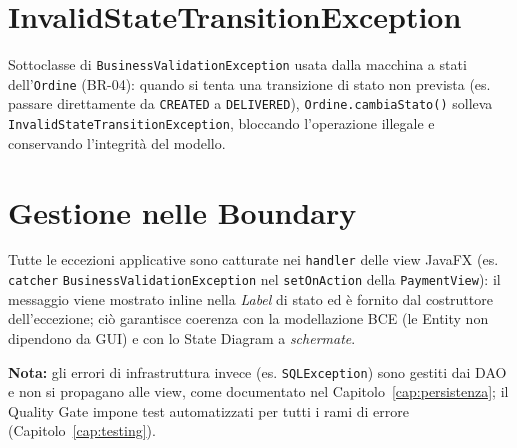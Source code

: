\section{InvalidStateTransitionException}
Sottoclasse di \texttt{BusinessValidationException} usata dalla macchina a
stati dell'\texttt{Ordine} (BR-04): quando si tenta una transizione di stato
non prevista (es. passare direttamente da \texttt{CREATED} a
\texttt{DELIVERED}), \texttt{Ordine.cambiaStato()} solleva
\texttt{InvalidStateTransitionException}, bloccando l'operazione illegale e
conservando l'integrità del modello.

\section{Gestione nelle Boundary}
Tutte le eccezioni applicative sono catturate nei \texttt{handler} delle
view JavaFX (es. \texttt{catcher} \texttt{BusinessValidationException} nel
\texttt{setOnAction} della \texttt{PaymentView}): il messaggio viene mostrato
inline nella \emph{Label} di stato ed è fornito dal costruttore
dell'eccezione; ciò garantisce coerenza con la modellazione BCE (le Entity
non dipendono da GUI) e con lo State Diagram a \emph{schermate}.

\textbf{Nota:} gli errori di infrastruttura invece (es. \texttt{SQLException})
sono gestiti dai DAO e non si propagano alle view, come documentato nel
Capitolo~\ref{cap:persistenza}; il Quality Gate impone test automatizzati
per tutti i rami di errore (Capitolo~\ref{cap:testing}).